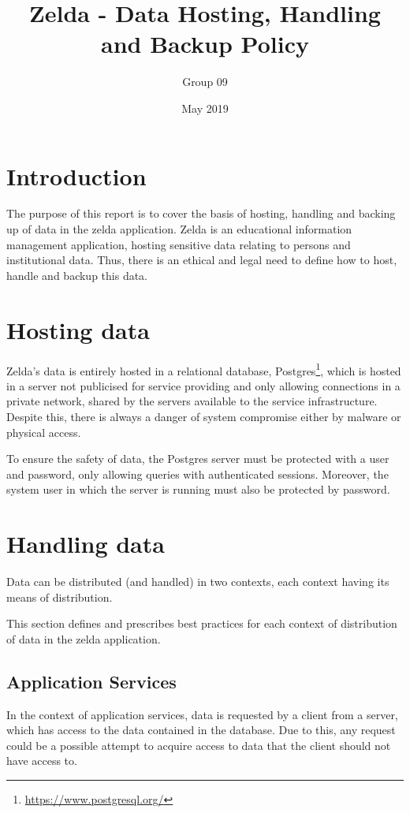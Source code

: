\documentclass{article}
\title{Zelda - Data Hosting, Handling and Backup Policy}
\author{Group 09}
\date{May 2019}
\begin{document}
\maketitle

\section{Introduction}

The purpose of this report is to cover the basis of hosting, handling and backing up of data in the zelda application. Zelda is an educational information management application, hosting sensitive data relating to persons and institutional data. Thus, there is an ethical and legal need to define how to host, handle and backup this data.

\section{Hosting data}

Zelda's data is entirely hosted in a relational database, Postgres\footnote{\url{https://www.postgresql.org/}}, which is hosted in a server not publicised for service providing and only allowing connections in a private network, shared by the servers available to the service infrastructure. Despite this, there is always a danger of system compromise either by malware or physical access.

To ensure the safety of data, the Postgres server must be protected with a user and password, only allowing queries with authenticated sessions. Moreover, the system user in which the server is running must also be protected by password.

\section{Handling data}

Data can be distributed (and handled) in two contexts, each context having its means of distribution.

This section defines and prescribes best practices for each context of distribution of data in the zelda application.

\subsection{Application Services}

In the context of application services, data is requested by a client from a server, which has access to the data contained in the database. Due to this, any request could be a possible attempt to acquire access to data that the client should not have access to.
\end{document}
